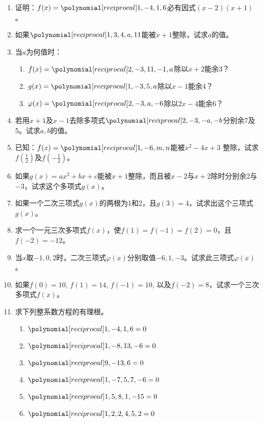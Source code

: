 \begin{enumerate}
\item 证明：$f(x)=\poly{1,-4,1,6}$必有因式$(x-2)(x+1)$。
\item 如果$\poly{1,3,4,a,11}$能被$x+1$整除，试求$a$的值。
\item 当$a$为何值时：
\begin{enumerate}
    \item $f(x)=\poly{2,-3,11,-1,a}$除以$x+2$能余3？
    \item $g(x)=\poly{1,-3,5,a}$除以$x-1$能余4？
    \item $\varphi(x)=\poly{2,-3,a,-6}$除以$2x-4$能余6？
\end{enumerate}

\item 若用$x+1$及$x-1$去除多项式$\poly{2,-3,-a,-b}$分别余7及5。试求$a,b$的值。

\item 已知：$f(x)=\poly{1,-6,m,n}$能被$x^2-4x+3$
整除，试求$f\left(\frac{1}{2}\right)$及$f\left(-\frac{1}{2}\right)$。

\item 如果$g(x)=ax^2+bx+c$能被$x+1$整除，而且被$x-2$与$x+2$除时分别余2与$-3$，试求这个多项式$g(x)$。

\item 如果一个二次三项式$g(x)$的两根为1和2，且$g(3)=4$，试求出这个三项式$g(x)$。

\item 求一个一元三次多项式$f(x)$，使$f(1)=f(-1)=f(2)=0$，且$f(-2)=-12$。
\item 当$x$取$-1, 0, 2$时，二次三项式$\varphi(x)$分别取值$-6,1,-3$。试求此三项式$\varphi(x)$。
\item 如果$f(0)=10$, $f(1)=14$, $f(-1)=10$, 以及$f(-2)=8$，试求一个三次多项式$f(x)$。

\item 求下列整系数方程的有理根。
\begin{multicols}{2}
    \begin{enumerate}
    \item $\poly{1,-4,1,6}=0$
    \item $\poly{1,-8,13,-6}=0$
    \item $\poly{9,-13,6}=0$
    \item $\poly{1,-7,5,7,-6}=0$
    \item $\poly{1,5,8,1,-15}=0$
    \item $\poly{1,2,2,4,5,2}=0$
\end{enumerate}
\end{multicols}


\end{enumerate}
